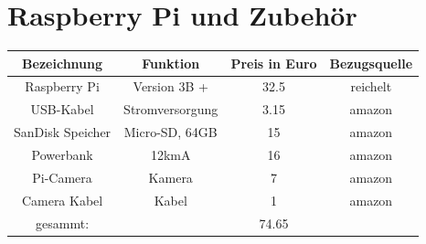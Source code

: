 \documentclass[a4paper,cleardoubleempty,BCOR1cm]{book}
\begin{document}
\section{Raspberry Pi und Zubehör}
\begin{center}
	\begin{tabular}{|c|c|c|c|}
		\hline
		Bezeichnung			&Funktion				& Preis	in Euro			&Bezugsquelle\\
		\hline
		Raspberry Pi 		& Version 3B +			& 32.5			& reichelt		\\
		USB-Kabel			& Stromversorgung		& 3.15			& amazon		\\
		SanDisk Speicher	& Micro-SD, 64GB		& 15			& amazon \\
		Powerbank			& 12kmA					& 16			& amazon \\
		Pi-Camera			&Kamera					& 7				& amazon		\\
		Camera Kabel		&Kabel					& 1				& amazon		\\
		\hline
		gesammt:			&						& 74.65				&\\
		\hline
	\end{tabular}
\end{center}
\end{document}
